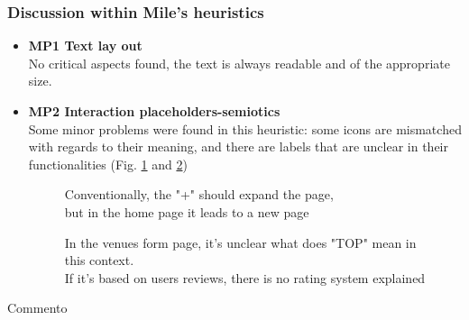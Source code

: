 \subsubsection{Discussion within Mile's heuristics}
\begin{itemize}
    \item \textbf{MP1 Text lay out}\\
    No critical aspects found, the text is always readable and of the appropriate size.\\
    \item \textbf{MP2 Interaction placeholders-semiotics}\\
    Some minor problems were found in this heuristic: some icons are mismatched with regards to their meaning, and there are labels that are unclear in their functionalities (Fig. \ref{MP2-1} and \ref{MP2-2})
    \begin{figure}[!ht]
        \begin{minipage}{\linewidth}
            \centering
            \captionsetup{justification=centering}
            \caption{Conventionally, the "+" should expand the page,\\
            but in the home page it leads to a new page}
            \label{MP2-1}
        \end{minipage}
    \end{figure}
    \begin{figure}[!ht]
        \begin{minipage}{\linewidth}
            \centering
            \captionsetup{justification=centering}
            \caption{In the venues form page, it's unclear what does "TOP" mean in this context.\\If it's based on users reviews, there is no rating system explained}
            \label{MP2-2}
        \end{minipage}
    \end{figure}
\end{itemize}

\pagebreak
Commento